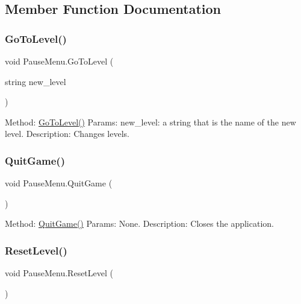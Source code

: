 \subsection{Member Function Documentation}
\mbox{\label{class_pause_menu_a4395036ff419068f189806d0762f755f}} 
\subsubsection{\texorpdfstring{GoToLevel()}{GoToLevel()}}
{\footnotesize\ttfamily void Pause\+Menu.\+Go\+To\+Level (\begin{DoxyParamCaption}\item[{string}]{new\+\_\+level }\end{DoxyParamCaption})}

Method\+: \mbox{\hyperlink{class_pause_menu_a4395036ff419068f189806d0762f755f}{Go\+To\+Level()}} Params\+: new\+\_\+level\+: a string that is the name of the new level. Description\+: Changes levels. \mbox{\label{class_pause_menu_a833077a2752465d59d0e7e5ad756b7ab}} 
\subsubsection{\texorpdfstring{QuitGame()}{QuitGame()}}
{\footnotesize\ttfamily void Pause\+Menu.\+Quit\+Game (\begin{DoxyParamCaption}{ }\end{DoxyParamCaption})}

Method\+: \mbox{\hyperlink{class_pause_menu_a833077a2752465d59d0e7e5ad756b7ab}{Quit\+Game()}} Params\+: None. Description\+: Closes the application. \mbox{\label{class_pause_menu_a701999bbc15ddc71f197239875b55fda}} 
\subsubsection{\texorpdfstring{ResetLevel()}{ResetLevel()}}
{\footnotesize\ttfamily void Pause\+Menu.\+Reset\+Level (\begin{DoxyParamCaption}{ }\end{DoxyParamCaption})}

